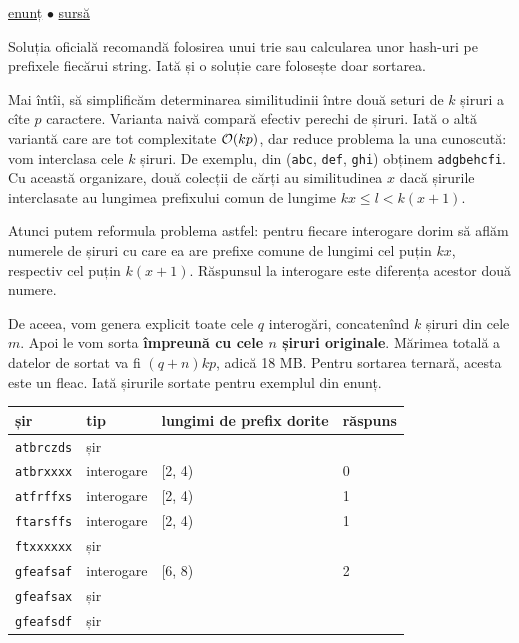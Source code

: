 \documentclass[../main.tex]{subfiles}
\begin{document}
\href{https://kilonova.ro/problems/289}{enunț}
$\bullet$
\hyperref[code:sabin]{sursă}

Soluția oficială recomandă folosirea unui trie sau calcularea unor hash-uri pe prefixele fiecărui string. Iată și o soluție care folosește doar sortarea.

Mai întîi, să simplificăm determinarea similitudinii între două seturi de $k$ șiruri a cîte $p$ caractere. Varianta naivă compară efectiv perechi de șiruri. Iată o altă variantă care are tot complexitate $\mathcal{O}(kp)$, dar reduce problema la una cunoscută: vom interclasa cele $k$ șiruri. De exemplu, din (\texttt{abc}, \texttt{def}, \texttt{ghi}) obținem \texttt{adgbehcfi}. Cu această organizare, două colecții de cărți au similitudinea $x$ dacă șirurile interclasate au lungimea prefixului comun de lungime $kx \leq l < k(x + 1)$.

Atunci putem reformula problema astfel: pentru fiecare interogare dorim să aflăm numerele de șiruri cu care ea are prefixe comune de lungimi cel puțin $kx$, respectiv cel puțin $k(x + 1)$. Răspunsul la interogare este diferența acestor două numere.

De aceea, vom genera explicit toate cele $q$ interogări, concatenînd $k$ șiruri din cele $m$. Apoi le vom sorta \textbf{împreună cu cele $n$ șiruri originale}. Mărimea totală a datelor de sortat va fi $(q + n)kp$, adică 18 MB. Pentru sortarea ternară, acesta este un fleac.  Iată șirurile sortate pentru exemplul din enunț.

\begin{table}[H]
  \centering
  \begin{tabular}{llll}
    \textbf{șir} & \textbf{tip} & \textbf{lungimi de prefix dorite} & \textbf{răspuns} \\
    \hline
    \texttt{atbrczds} & șir & & \\
    \texttt{atbrxxxx} & interogare & [2, 4) & 0 \\
    \texttt{atfrffxs} & interogare & [2, 4) & 1 \\
    \texttt{ftarsffs} & interogare & [2, 4) & 1 \\
    \texttt{ftxxxxxx} & șir & & \\
    \texttt{gfeafsaf} & interogare & [6, 8) & 2 \\
    \texttt{gfeafsax} & șir & & \\
    \texttt{gfeafsdf} & șir & & \\
    \hline
  \end{tabular}
\end{table}
\end{document}
